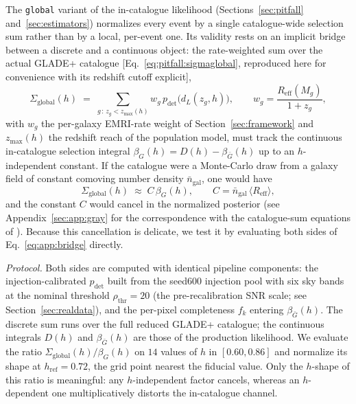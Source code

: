 The \texttt{global} variant of the in-catalogue likelihood
(Sections~\ref{sec:pitfall} and~\ref{sec:estimators}) normalizes every
event by a single catalogue-wide selection sum rather than by a local,
per-event one. Its validity rests on an implicit bridge between a
discrete and a continuous object: the rate-weighted sum over the actual
GLADE+ catalogue \citep{Dalya:2021ewn}
[Eq.~\eqref{eq:pitfall:sigmaglobal}, reproduced here for convenience
with its redshift cutoff explicit],
\begin{equation}
  \Sigma_{\mathrm{global}}(h) \;=\;
  \sum_{g\,:\,z_g < z_{\max}(h)} w_g\,
  p_{\mathrm{det}}\!\big(d_L(z_g, h)\big),
  \qquad
  w_g = \frac{R_{\mathrm{eff}}(M_g)}{1+z_g},
\end{equation}
with $w_g$ the per-galaxy EMRI-rate weight of
Section~\ref{sec:framework} \citep{Babak:2017tow} and $z_{\max}(h)$ the
redshift reach of the population model, must track the continuous
in-catalogue selection integral $\beta_G(h) = D(h) - \beta_{\bar G}(h)$
up to an $h$-independent constant. If the catalogue were a
Monte-Carlo draw from a galaxy field of constant comoving number
density $\bar n_{\mathrm{gal}}$, one would have
\begin{equation}
  \Sigma_{\mathrm{global}}(h) \;\approx\; C\,\beta_G(h),
  \qquad
  C = \bar n_{\mathrm{gal}}\,\big\langle R_{\mathrm{eff}} \big\rangle ,
  \label{eq:app:bridge}
\end{equation}
and the constant $C$ would cancel in the normalized posterior (see
Appendix~\ref{sec:app:gray} for the correspondence with the
catalogue-sum equations of \citealt{Gray:2019ksv}). Because this
cancellation is delicate, we test it by evaluating both sides of
Eq.~\eqref{eq:app:bridge} directly.

\medskip
\noindent\textit{Protocol.} Both sides are computed with identical
pipeline components: the injection-calibrated $p_{\mathrm{det}}$ built
from the seed600 injection pool with six sky bands at the nominal
threshold $\rho_{\mathrm{thr}} = 20$
(the pre-recalibration SNR scale; see Section~\ref{sec:realdata}), and
the per-pixel completeness $f_k$ entering $\beta_{\bar G}(h)$. The
discrete sum runs over the full reduced GLADE+ catalogue; the
continuous integrals $D(h)$ and $\beta_{\bar G}(h)$ are those of the
production likelihood. We evaluate the ratio
$\Sigma_{\mathrm{global}}(h)/\beta_G(h)$ on $14$ values of $h$ in
$[0.60, 0.86]$ and normalize its shape at $h_{\mathrm{ref}} = 0.72$,
the grid point nearest the fiducial value. Only the $h$-shape of this
ratio is meaningful: any $h$-independent factor cancels, whereas an
$h$-dependent one multiplicatively distorts the in-catalogue channel.

